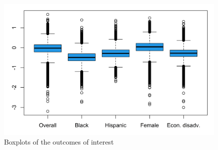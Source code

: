 \begin{figure}[!h]
	\centering
	\includegraphics[scale=1]{"../Code & Data/DepVarsBoxplot.png"}
	\caption{Boxplots of the outcomes of interest}
	\label{DepVarsBoxplot}
\end{figure}








